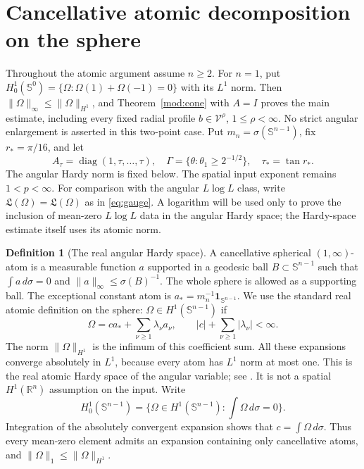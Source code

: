 \documentclass[11pt]{article}
\numberwithin{equation}{section}
\theoremstyle{remark}
\theoremstyle{definition}
\newtheorem{definition}[theorem]{Definition}
\newcommand{\Sph}{\mathbb S}
\newcommand{\LL}{\mathfrak L}
\begin{document}
\section{Cancellative atomic decomposition on the sphere}\label{mod:atom:sec:atoms}\label{mod:sec-atoms}
Throughout the atomic argument assume $n\ge2$. For $n=1$, put
$H^1_0(\mathbb S^0)=\{\Omega:\Omega(1)+\Omega(-1)=0\}$ with its
$L^1$ norm. Then $\|\Omega\|_\infty\le\|\Omega\|_{H^1}$, and
Theorem~\ref{mod:cone} with $A=I$ proves the main estimate, including
every fixed radial profile $b\in\mathcal V^\rho$, $1\le\rho<\infty$.
No strict angular enlargement is asserted in this two-point case. Put
$m_n=\sigma(\Sph^{n-1})$, fix $r_*=\pi/16$, and let
\[
 A_\tau=\operatorname{diag}(1,\tau,\ldots,\tau),\quad
 \Gamma=\{\theta:\theta_1\ge2^{-1/2}\},\quad \tau_*=\tan r_*.
\]
The angular Hardy norm is fixed below. The spatial input exponent
remains $1<p<\infty$. For comparison with the angular $L\log L$
class, write $\LL(\Omega)=\mathfrak L(\Omega)$ as in
\eqref{eq:gauge}. A logarithm will be used only to prove the inclusion
of mean-zero $L\log L$ data in the angular Hardy space; the Hardy-space
estimate itself uses its atomic norm.

\begin{definition}[The real angular Hardy space]\label{mod:atom:def:H1}
A cancellative spherical $(1,\infty)$-atom is a measurable function
$a$ supported in a geodesic ball $B\subset\mathbb S^{n-1}$ such that
$\int a\,d\sigma=0$ and $\|a\|_\infty\le\sigma(B)^{-1}$. The whole
sphere is allowed as a supporting ball. The exceptional constant atom
is $a_*=m_n^{-1}\mathbf1_{\mathbb S^{n-1}}$. We use the standard real
atomic definition on the sphere: $\Omega\in H^1(\mathbb S^{n-1})$ if
\[
 \Omega=c a_*+\sum_{\nu\ge1}\lambda_\nu a_\nu,
 \qquad |c|+\sum_{\nu\ge1}|\lambda_\nu|<\infty.
\]
The norm $\|\Omega\|_{H^1}$ is the infimum of this coefficient sum.
All these expansions converge absolutely in $L^1$, because every
atom has $L^1$ norm at most one. This is the real atomic Hardy space
of the angular variable; see \cite{CoifmanWeiss77,Colzani85}. It is
not a spatial $H^1(\mathbb R^n)$ assumption on the input.
Write
\[
 H^1_0(\mathbb S^{n-1})
 =\{\Omega\in H^1(\mathbb S^{n-1}):\textstyle\int\Omega\,d\sigma=0\}.
\]
Integration of the absolutely convergent expansion shows that
$c=\int\Omega\,d\sigma$. Thus every mean-zero element admits an
expansion containing only cancellative atoms, and
$\|\Omega\|_1\le\|\Omega\|_{H^1}$.
\end{definition}
\end{document}
